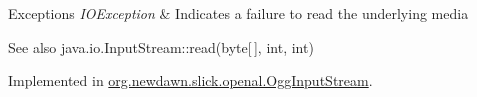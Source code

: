 \begin{DoxyExceptions}{Exceptions}
{\em I\+O\+Exception} & Indicates a failure to read the underlying media \\
\hline
\end{DoxyExceptions}
\begin{DoxySeeAlso}{See also}
java.\+io.\+Input\+Stream\+::read(byte\mbox{[}$\,$\mbox{]}, int, int) 
\end{DoxySeeAlso}


Implemented in \mbox{\hyperlink{classorg_1_1newdawn_1_1slick_1_1openal_1_1_ogg_input_stream_ab03aec502a7165b31f7fcb1fbb596a5f}{org.\+newdawn.\+slick.\+openal.\+Ogg\+Input\+Stream}}.

